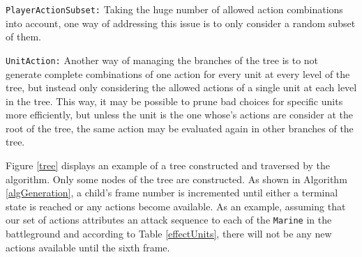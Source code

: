 \begin{shortitem}
\item \texttt{PlayerActionSubset:}
	Taking the huge number of allowed action combinations into account, one way of addressing this issue is to only consider a random subset of them.
\item \texttt{UnitAction:}
	Another way of managing the branches of the tree is to not generate complete combinations of one action for every unit at every level of the tree, but instead only considering the allowed actions of a single unit at each level in the tree.
	This way, it may be possible to prune bad choices for specific units more efficiently, but unless the unit is the one whose's actions are consider at the root of the tree, the same action may be evaluated again in other branches of the tree.
\end{shortitem}

Figure \ref{tree} displays an example of a tree constructed and traversed by the algorithm. Only some nodes of the tree are constructed.
As shown in Algorithm \ref{algGeneration}, a child's frame number is incremented until either a terminal state is reached or any actions become available.
As an example, assuming that our set of actions attributes an attack sequence to each of the \texttt{Marine} in the battleground and according to Table \ref{effectUnits}, there will not be any new actions available until the sixth frame.

